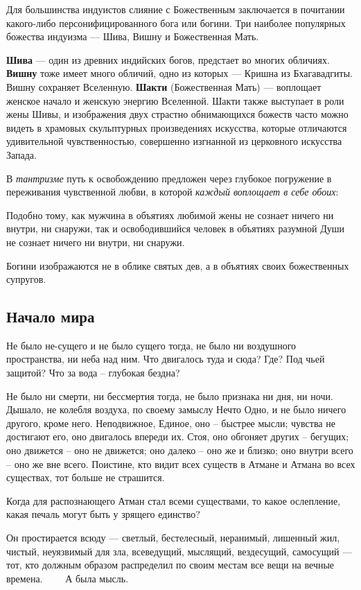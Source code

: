 Для большинства индуистов слияние с Божественным заключается в почитании какого-либо персонифицированного бога или
богини. Три наиболее популярных божества индуизма — Шива, Вишну и Божественная Мать.

\textbf{Шива} — один из древних индийских богов, предстает во многих обличиях. \textbf{Вишну} тоже имеет много обличий,
одно из которых — Кришна из Бхагавадгиты. Вишну сохраняет Вселенную. \textbf{Шакти} (Божественная Мать) — воплощает
женское начало и женскую энергию Вселенной. Шакти также выступает в роли жены Шивы, и изображения двух страстно
обнимающихся божеств часто можно видеть в храмовых скульптурных произведениях искусства, которые отличаются
удивительной чувственностью, совершенно изгнанной из церковного искусства Запада.

В \textit{тантризме} путь к освобождению предложен через глубокое погружение в переживания чувственной любви, в которой
\textit{каждый воплощает в себе обоих}:


\flqq Подобно тому, как мужчина в объятиях любимой жены не сознает ничего ни внутри, ни снаружи, так и освободившийся человек
в объятиях разумной Души не сознает ничего ни внутри, ни снаружи\frqq.

Богини изображаются не в облике святых дев, а в объятиях своих божественных супругов.

\subsection[Начало мира]{Начало мира}
\flqq Не было не-сущего и не было сущего тогда, не было ни воздушного пространства, ни неба над ним. Что двигалось туда и
сюда? Где? Под чьей защитой? Что за вода – глубокая бездна?

Не было ни смерти, ни бессмертия тогда, не было признака ни дня, ни ночи. Дышало, не колебля воздуха, по своему замыслу
Нечто Одно, и не было ничего другого, кроме него. Неподвижное, Единое, оно – быстрее мысли; чувства не достигают его,
оно двигалось впереди их. Стоя, оно обгоняет других – бегущих; оно движется – оно не движется; оно далеко – оно же и
близко; оно внутри всего – оно же вне всего. Поистине, кто видит всех существ в Атмане и Атмана во всех существах, тот
больше не страшится.

Когда для распознающего Атман стал всеми существами, то какое ослепление, какая печаль могут быть у зрящего единство?

Он простирается всюду — светлый, бестелесный, неранимый, лишенный жил, чистый, неуязвимый для зла, всеведущий, мыслящий,
вездесущий, самосущий — тот, кто должным образом распределил по своим местам все вещи на вечные времена. \ \ \ \ А была
мысль.\frqq

